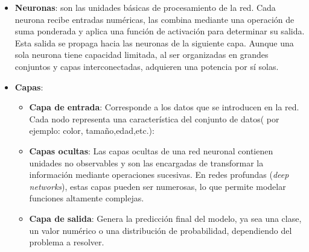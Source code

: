 \documentclass[11pt]{article} %
\begin{document}
\begin{itemize}
    \item\textbf{Neuronas}: son las unidades básicas de procesamiento de la red. Cada neurona recibe entradas numéricas, las combina mediante una operación de suma ponderada y aplica una función de activación para determinar su salida. Esta salida se propaga hacia las neuronas de la siguiente capa. Aunque una sola neurona tiene capacidad limitada, al ser organizadas en grandes conjuntos y capas interconectadas, adquieren una potencia por sí solas.

    \item\textbf{Capas}:
    \begin{itemize}
        \item \textbf{Capa de entrada}: Corresponde a los datos que se introducen en la red. Cada nodo representa una característica del conjunto de datos( por ejemplo: color, tamaño,edad,etc.):
        \item\textbf{Capas ocultas}: Las capas ocultas de una red neuronal contienen unidades no observables y son las encargadas de transformar la información mediante operaciones sucesivas. En redes profundas (\textit{deep networks}), estas capas pueden ser numerosas, lo que permite modelar funciones altamente complejas.
        \item\textbf{Capa de salida}: Genera la predicción final del modelo, ya sea una clase, un valor numérico o una distribución de probabilidad, dependiendo del problema a resolver.
    \end{itemize}


\end{itemize}
\end{document}
